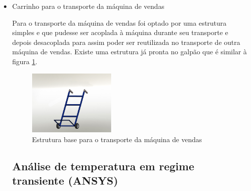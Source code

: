\begin{itemize}
\item Carrinho para o transporte da máquina de vendas

	Para o transporte da máquina de vendas foi optado por uma estrutura simples e que pudesse ser acoplada à máquina durante seu transporte e depois desacoplada para assim poder ser reutilizada no transporte de outra máquina de vendas. Existe uma  estrutura já pronta no galpão que é similar à figura \ref{fig:Render_-_Carro_de_Transporte}.

   \begin{figure}[H]
	\centering
    \includegraphics[width=0.4\textwidth]{figuras/Render_-_Carro_de_Transporte}
    \caption{Estrutura base para o transporte da máquina de vendas}
    \label{fig:Render_-_Carro_de_Transporte}
\end{figure}

\subsection{Análise de temperatura em regime transiente (ANSYS)}


\end{itemize}
